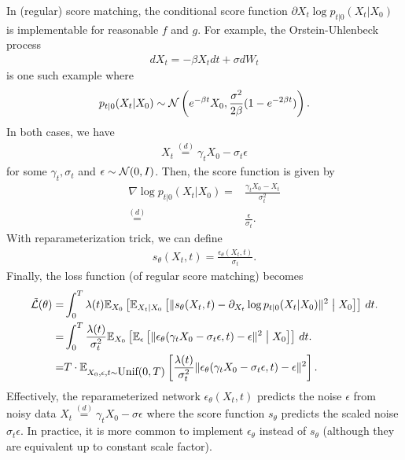 \documentclass[11pt]{article}
\begin{document}
In (regular) score matching, the conditional score function $\partial{X_t} \log p_{t|0}(X_t|X_0)$ is implementable for reasonable $f$ and $g$.
For example, the Orstein-Uhlenbeck process
\begin{align}
    dX_t = -\beta X_t dt + \sigma dW_t
\end{align}
is one such example where
\begin{align}
    p_{t|0} (X_t|X_0) \sim {\cal N}\left( e^{-\beta t}X_0, \frac{\sigma^2}{2\beta} (1-e^{-2\beta t})\right).
\end{align}
In both cases, we have
\begin{align}
    X_t \stackrel{(d)}{=} \gamma_t X_0 - \sigma_t \epsilon
\end{align}
for some $\gamma_t, \sigma_t$ and $\epsilon\sim {\cal N}(0, I)$.
Then, the score function is given by
\begin{align}
    \nabla \log p_{t|0}(X_t|X_0) =& \frac{\gamma_t X_0 - X_t}{\sigma_t^2}\\
    \stackrel{(d)}{=}& \frac{\epsilon}{\sigma_t}.
\end{align}
With reparameterization trick, we can define
\begin{align}
    s_{\theta}(X_t, t) = \frac{\epsilon_\theta(X_t, t)}{\sigma_t}.
\end{align}
Finally, the loss function (of regular score matching) becomes
    \begin{align}
        \tilde{\cL}(\theta) 
        =& \int_{0}^T \lambda(t) \fE_{X_0}\left[\fE_{X_t|X_0}\left[ \| s_\theta(X_t, t)  - \partial_{X_t} \log p_{t|0}(X_t|X_0)\|^2 \suchthat X_0\right]\right]\, dt.\\
        =& \int_{0}^T \frac{\lambda(t)}{\sigma_t^2} \fE_{X_0}\left[\fE_{\epsilon}\left[ \| \epsilon_\theta(\gamma_tX_0 - \sigma_t\epsilon, t) - \epsilon\|^2 \suchthat X_0\right]\right]\, dt.\\
        =& T\cdot  \fE_{X_0, \epsilon, t\sim\mbox{Unif$(0,T)$}}\left[\frac{\lambda(t)}{\sigma_t^2} \| \epsilon_\theta(\gamma_tX_0 - \sigma_t\epsilon, t) - \epsilon\|^2 \right].
    \end{align}
Effectively, the reparameterized network $\epsilon_\theta(X_t, t)$ predicts the noise $\epsilon$ from noisy data $X_t \stackrel{(d)}{=} \gamma_t X_0 - \sigma \epsilon$
where the score function $s_\theta$ predicts the scaled noise $\sigma_t\epsilon$.
In practice, it is more common to implement $\epsilon_\theta$ instead of $s_\theta$ (although they are equivalent up to constant scale factor).
\end{document}
